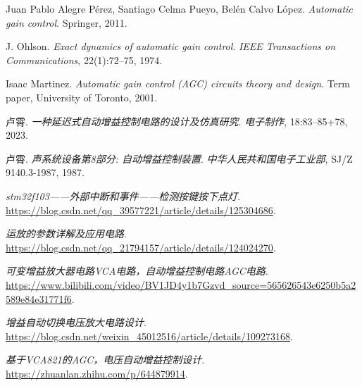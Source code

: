 \documentclass[lang=cn,11pt,a4paper]{elegantpaper}
\begin{document}
\begin{thebibliography}{99} %
  Juan Pablo Alegre Pérez, Santiago Celma Pueyo, Belén Calvo López.
  \textit{Automatic gain control}.
  Springer, 2011.

  J. Ohlson.
  \textit{Exact dynamics of automatic gain control}.
  \textit{IEEE Transactions on Communications}, 22(1):72--75, 1974.

  Isaac Martinez.
  \textit{Automatic gain control (AGC) circuits theory and design}.
  Term paper, University of Toronto, 2001.

  卢霄.
  \textit{一种延迟式自动增益控制电路的设计及仿真研究}.
  \textit{电子制作}, 18:83--85+78, 2023.

  卢霄.
  \textit{声系统设备第8部分: 自动增益控制装置}.
  \textit{中华人民共和国电子工业部}, SJ/Z 9140.3-1987, 1987.


  \textit{stm32f103——外部中断和事件——检测按键按下点灯}.
  \url{https://blog.csdn.net/qq_39577221/article/details/125304686}.

  \textit{运放的参数详解及应用电路}.
  \url{https://blog.csdn.net/qq_21794157/article/details/124024270}.

  \textit{可变增益放大器电路VCA电路，自动增益控制电路AGC电路}.
  \url{https://www.bilibili.com/video/BV1JD4y1b7Gzvd_source=565626543e6250b5a2589e84e31771f6}.

  \textit{增益自动切换电压放大电路设计}.
  \url{https://blog.csdn.net/weixin_45012516/article/details/109273168}.

  \textit{基于VCA821的AGC，电压自动增益控制设计}.
  \url{https://zhuanlan.zhihu.com/p/644879914}.
\end{thebibliography}
\end{document}
